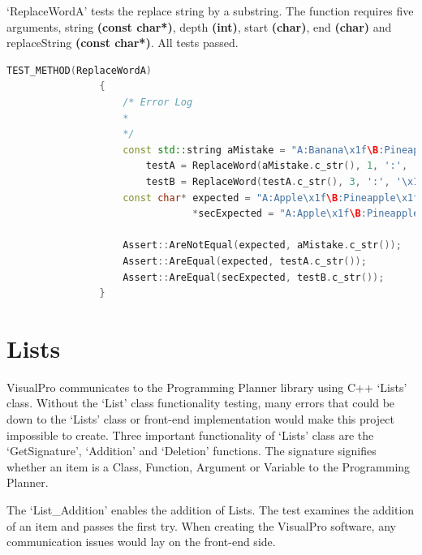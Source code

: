 \documentclass[12pt]{report} %
\begin{document}
			`ReplaceWordA' tests the replace string by a substring. The function requires five arguments, string \textbf{(const char*)}, depth \textbf{(int)}, start \textbf{(char)}, end \textbf{(char)} and replaceString \textbf{(const char*)}. All tests passed.
			\begin{lstlisting}[language=c++]
				TEST_METHOD(ReplaceWordA)
				{
					/* Error Log
					* 
					*/
					const std::string aMistake = "A:Banana\x1f\B:Pineapple\x1f\C:Grapefruit",
						testA = ReplaceWord(aMistake.c_str(), 1, ':', '\x1f', "Apple"),
						testB = ReplaceWord(testA.c_str(), 3, ':', '\x1f', "Banana");
					const char* expected = "A:Apple\x1f\B:Pineapple\x1f\C:Grapefruit",
								*secExpected = "A:Apple\x1f\B:Pineapple\x1f\C:Banana";

					Assert::AreNotEqual(expected, aMistake.c_str());
					Assert::AreEqual(expected, testA.c_str());
					Assert::AreEqual(secExpected, testB.c_str());
				}
			\end{lstlisting}
		\section{Lists}
			VisualPro communicates to the Programming Planner library using C++ `Lists' class. Without the `List' class functionality testing, many errors that could be down to the `Lists' class or front-end implementation would make this project impossible to create. Three important functionality of `Lists' class are the `GetSignature', `Addition' and `Deletion' functions. The signature signifies whether an item is a Class, Function, Argument or Variable to the Programming Planner.
            
            The `List\_Addition' enables the addition of Lists. The test examines the addition of an item and passes the first try. When creating the VisualPro software, any communication issues would lay on the front-end side.
\end{document}

